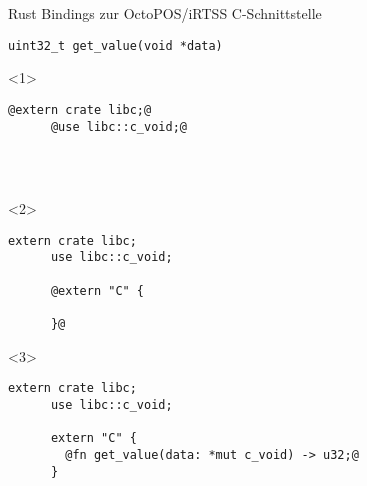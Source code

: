 

\lstset{showstringspaces=true,columns=fullflexible,keepspaces=true}

\begin{frame}[fragile]{Rust Bindings zur OctoPOS/iRTSS C-Schnittstelle}

  \begin{lstlisting}[frame=single,style=base]
    uint32_t get_value(void *data)
  \end{lstlisting}

  \begin{onlyenv}<1> {
    \begin{lstlisting}[frame=single,style=base]
      @extern crate libc;@
      @use libc::c_void;@




    \end{lstlisting}
  }
  \end{onlyenv}

  \begin{onlyenv}<2> {
    \begin{lstlisting}[frame=single,style=base]
      extern crate libc;
      use libc::c_void;

      @extern "C" {

      }@
    \end{lstlisting}
  }
  \end{onlyenv}

  \begin{onlyenv}<3> {
    \begin{lstlisting}[frame=single,style=base]
      extern crate libc;
      use libc::c_void;

      extern "C" {
        @fn get_value(data: *mut c_void) -> u32;@
      }
    \end{lstlisting}
  }
  \end{onlyenv}

\end{frame}